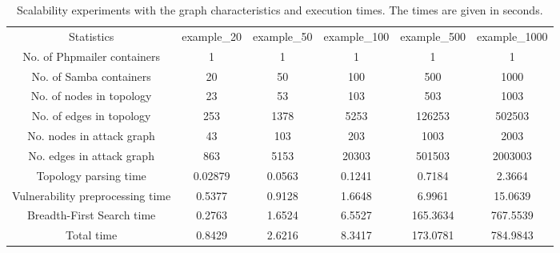 \begin{table*}
	\begin{center}
		\begin{tabular}{ |c|c|c|c|c|c| } 
			\hline
			Statistics & example\_20 & example\_50 & example\_100 & example\_500 & example\_1000 \\ 
			
			No. of Phpmailer containers & 1 & 1 & 1 & 1 & 1 \\ 
			
			No. of Samba containers & 20 & 50 & 100 & 500 & 1000 \\ 
			
			No. of nodes in topology & 23 & 53 & 103 & 503 & 1003\\ 
			
			No. of edges in topology & 253 & 1378 & 5253 & 126253 & 502503 \\ 
			
			No. nodes in attack graph & 43 & 103 & 203 & 1003 & 2003 \\ 
			
			No. edges in attack graph & 863 & 5153 & 20303 & 501503 & 2003003 \\ 
			
			Topology parsing time & 0.02879 & 0.0563 & 0.1241 & 0.7184 & 2.3664 \\ 
			
			Vulnerability preprocessing time & 0.5377 & 0.9128 & 1.6648 & 6.9961 & 15.0639 \\ 
			
			Breadth-First Search time & 0.2763 & 1.6524 & 6.5527 & 165.3634 & 767.5539 \\ 
			
			Total time & 0.8429 & 2.6216 & 8.3417 & 173.0781 & 784.9843 \\ 
			\hline
		\end{tabular}
	\end{center}
	
	\caption{Scalability experiments with the graph characteristics and execution times. The times are given in seconds.}
	
	\label{table_scalability}
\end{table*}

